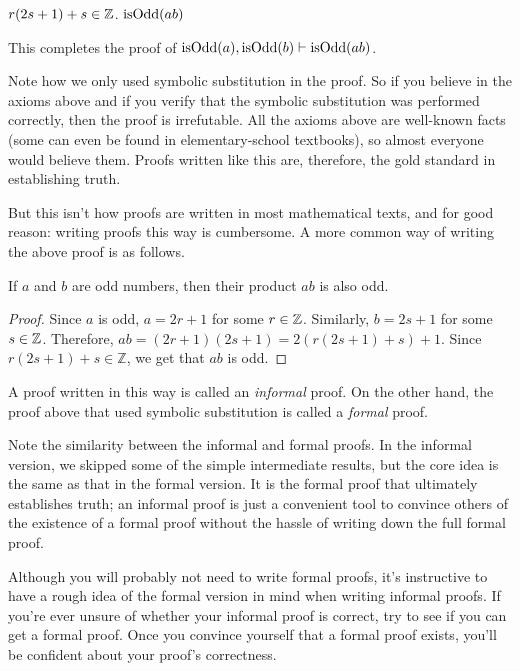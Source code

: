 \begin{formalproof}
\State \label{p1:tinZ}$r(2s+1)+s \in \mathbb{Z}$.
\State \label{p1:final}$\operatorname{isOdd}(ab)$
\end{formalproof}

This completes the proof of $\operatorname{isOdd}(a), \operatorname{isOdd}(b) \vdash \operatorname{isOdd}(ab)$.

Note how we only used symbolic substitution in the proof.
So if you believe in the axioms above and if you verify that the symbolic
substitution was performed correctly, then the proof is irrefutable.
All the axioms above are well-known facts
(some can even be found in elementary-school textbooks),
so almost everyone would believe them.
Proofs written like this are, therefore, the gold standard in establishing truth.

But this isn't how proofs are written in most mathematical texts,
and for good reason: writing proofs this way is cumbersome.
A more common way of writing the above proof is as follows.

\begin{lemma}
If $a$ and $b$ are odd numbers, then their product $ab$ is also odd.
\end{lemma}
\begin{proof}
Since $a$ is odd, $a = 2r+1$ for some $r \in \mathbb{Z}$.
Similarly, $b = 2s+1$ for some $s \in \mathbb{Z}$.
Therefore, $ab = (2r+1)(2s+1) = 2(r(2s+1)+s)+1$.
Since $r(2s+1)+s \in \mathbb{Z}$, we get that $ab$ is odd.
\end{proof}

A proof written in this way is called an \emph{informal} proof.
On the other hand, the proof above that used symbolic substitution
is called a \emph{formal} proof.

Note the similarity between the informal and formal proofs.
In the informal version, we skipped some of the simple intermediate results,
but the core idea is the same as that in the formal version.
It is the formal proof that ultimately establishes truth;
an informal proof is just a convenient tool to convince others of the existence of
a formal proof without the hassle of writing down the full formal proof.

Although you will probably not need to write formal proofs, it's instructive to
have a rough idea of the formal version in mind when writing informal proofs.
If you're ever unsure of whether your informal proof is correct,
try to see if you can get a formal proof.
Once you convince yourself that a formal proof exists,
you'll be confident about your proof's correctness.

